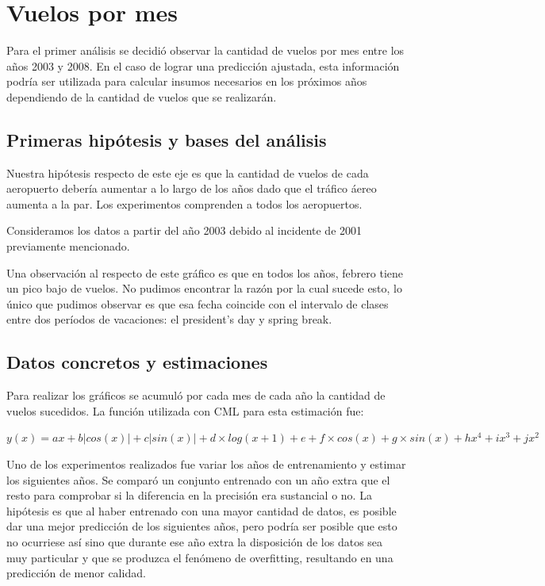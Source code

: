 \section{Vuelos por mes}

Para el primer análisis se decidió observar la cantidad de vuelos por mes entre los años 2003 y 2008. En el caso de lograr una predicción ajustada, esta información podría ser utilizada para calcular insumos necesarios en los próximos años dependiendo de la cantidad de vuelos que se realizarán.

\subsection{Primeras hipótesis y bases del análisis}

Nuestra hipótesis respecto de este eje es que la cantidad de vuelos de cada aeropuerto debería aumentar a lo largo de los años dado que el tráfico áereo aumenta a la par. Los experimentos comprenden a todos los aeropuertos.

Consideramos los datos a partir del año 2003 debido al incidente de 2001 previamente mencionado.

Una observación al respecto de este gráfico es que en todos los años, febrero tiene un pico bajo de vuelos. No pudimos encontrar la razón por la cual sucede esto, lo único que pudimos observar es que esa fecha coincide con el intervalo de clases entre dos períodos de vacaciones: el president’s day y spring break.

\subsection{Datos concretos y estimaciones}

Para realizar los gráficos se acumuló por cada mes de cada año la cantidad de vuelos sucedidos. La función utilizada con CML para esta estimación fue:

\smallskip

$y(x) = ax + b|cos(x)| + c|sin(x)| + d \times log(x+1) + e + f \times cos(x) + g \times sin(x) + hx^4 + ix^3 + jx^2$

Uno de los experimentos realizados fue variar los años de entrenamiento y estimar los siguientes años. Se comparó un conjunto entrenado con un año extra que el resto para comprobar si la diferencia en la precisión era sustancial o no. La hipótesis es que al haber entrenado con una mayor cantidad de datos, es posible dar una mejor predicción de los siguientes años, pero podría ser posible que esto no ocurriese así sino que durante ese año extra la disposición de los datos sea muy particular y que se produzca el fenómeno de overfitting, resultando en una predicción de menor calidad.

